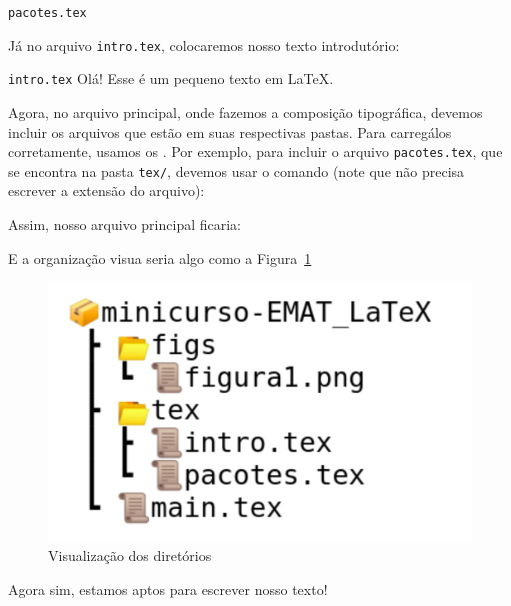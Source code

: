 \begin{codigo}{\texttt{pacotes.tex}}{\lapis}
\usepackage{fontspec} %
\usepackage[brazil]{babel} %

\usepackage[a5paper]{geometry} %
 
\usepackage{mathtools, amsthm, amssymb} %
\usepackage{booktabs} %
 
\usepackage{graphicx} %
  \graphicspath{{./fig/}} %

\usepackage{microtype} %
\end{codigo}

Já no arquivo \texttt{intro.tex}, colocaremos nosso texto introdutório:

\begin{codigo}{\texttt{intro.tex}}{\lapis}
Olá! Esse é um pequeno texto em \LaTeX.
\end{codigo}


Agora, no arquivo principal, onde fazemos a composição tipográfica, devemos incluir 
os arquivos que estão em suas respectivas pastas.
Para carregálos corretamente, usamos os {}.
Por exemplo, para incluir o arquivo \texttt{pacotes.tex}, que se encontra na pasta 
\texttt{tex/}, devemos usar o comando (note que não precisa escrever a extensão 
do arquivo):\\


Assim, nosso arquivo principal ficaria:


E a organização visua seria algo como a Figura~\ref{fig:diretorios}

\begin{figure}[!htbp]
  \centering
  \includegraphics[width=0.45\linewidth]{diretorios}
  \caption{Visualização dos diretórios}
  \label{fig:diretorios}
\end{figure}

Agora sim, estamos aptos para escrever nosso texto!